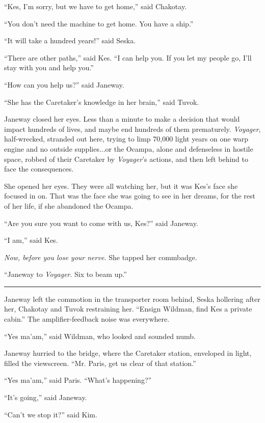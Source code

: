 \documentclass[twoside,letterpaper,12pt]{memoir}
\begin{document}
``Kes, I’m sorry, but we have to get home,” said Chakotay. 

``You don’t need the machine to get home. You have a ship.” 

``It will take a hundred years!” said Seska. 

``There are other paths,” said Kes. ``I can help you. If you let my people go, I’ll stay with you and help you.” 

``How can you help us?” said Janeway. 

``She has the Caretaker’s knowledge in her brain,” said Tuvok. 

Janeway closed her eyes. Less than a minute to make a decision that would impact hundreds of lives, and maybe end hundreds of them prematurely. \textit{Voyager}, half-wrecked, stranded out here, trying to limp 70,000 light years on one warp engine and no outside supplies...or the Ocampa, alone and defenseless in hostile space, robbed of their Caretaker by \textit{Voyager}’s actions, and then left behind to face the consequences. 

She opened her eyes. They were all watching her, but it was Kes’s face she focused in on. That was the face she was going to see in her dreams, for the rest of her life, if she abandoned the Ocampa. 

``Are you sure you want to come with us, Kes?” said Janeway. 

``I am,” said Kes. 

\textit{Now, before you lose your nerve. }She tapped her commbadge. 

``Janeway to \textit{Voyager}. Six to beam up.” 

\begin{center}\rule{3cm}{0.4 pt}\end{center} 

Janeway left the commotion in the transporter room behind, Seska hollering after her, Chakotay and Tuvok restraining her. ``Ensign Wildman, find Kes a private cabin.” The amplifier-feedback noise was everywhere. 

``Yes ma’am,” said Wildman, who looked and sounded numb. 

Janeway hurried to the bridge, where the Caretaker station, enveloped in light, filled the viewscreen. ``Mr. Paris, get us clear of that station.” 

``Yes ma’am,” said Paris. ``What’s happening?” 

``It’s going,” said Janeway. 

``Can’t we stop it?” said Kim. 
\end{document}
